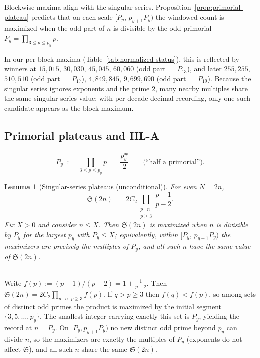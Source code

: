 \documentclass[11pt]{article}
\makeatletter
\theoremstyle{inline}
\theoremstyle{break}
\newtheorem{lemma}{Lemma}
\renewenvironment{proof}[1][\proofname]{%
  \par\pushQED{\qed}%
  \normalfont \topsep6\p@\@plus6\p@\relax
  \trivlist
  \item[\hskip\labelsep
        \itshape
    #1\@addpunct{.}]\mbox{}\\  %
}{%
  \popQED\endtrivlist\@endpefalse
}
\theoremstyle{break}
\theoremstyle{break}
\theoremstyle{break}
\theoremstyle{break}
\theoremstyle{break}
\theoremstyle{break}
\theoremstyle{inline}
\makeatother
\begin{document}
Blockwise maxima align with the singular series.  Proposition~\ref{prop:primorial-plateau} predicts that on each scale \([P_y,\,p_{y+1}P_y)\) the windowed count is maximized when the odd part of \(n\) is divisible by the odd primorial \(P_y=\prod_{3\le p\le p_y}p\).

In our per-block maxima (Table~\ref{tab:normalized-status}), this is reflected by winners at 
\(15{,}015\), \(30{,}030\), \(45{,}045\), \(60{,}060\) (odd part \(=P_{13}\)), 
and later \(255{,}255\), \(510{,}510\) (odd part \(=P_{17}\)), 
\(4{,}849{,}845\), \(9{,}699{,}690\) (odd part \(=P_{19}\)).
Because the singular series ignores exponents and the prime \(2\), many nearby multiples share the same singular-series value; with per-decade decimal recording, only one such candidate appears as the block maximum.


\subsection{Primorial plateaus and HL-A}\label{sec:primorial-prop}

\begin{equation}\label{eq:half-primorial}
P_y \;:=\; \prod_{3\le p\le p_y} p \;=\; \frac{p_y^\#}{2}\qquad\text{(``half a primorial'')}.
\end{equation}

\begin{lemma}[Singular-series plateaus (unconditional)]\label{lem:SS-plateau}
For even $N=2n$,
\begin{equation}\label{eq:sing-series-2n}
\mathfrak S(2n)\;=\;2C_2 \prod_{\substack{p\mid n\\ p\ge 3}}\frac{p-1}{p-2}.
\end{equation}
Fix $X>0$ and consider $n\le X$. Then $\mathfrak S(2n)$ is maximized when $n$ is divisible by $P_y$ for the largest $p_y$ with $P_y\le X$; equivalently, within $[P_y,\,p_{y+1}P_y)$ the maximizers are precisely the multiples of $P_y$, and all such $n$ have the same value of $\mathfrak S(2n)$.
\end{lemma}

\begin{proof}
Write $f(p):=(p-1)/(p-2)=1+\frac{1}{p-2}$. Then
\(\mathfrak S(2n)=2C_2\prod_{p\mid n,\,p\ge 3} f(p)\).
If $q>p\ge 3$ then $f(q)<f(p)$, so among sets of distinct odd primes the product is maximized by the initial segment $\{3,5,\dots,p_y\}$. The smallest integer carrying exactly this set is $P_y$, yielding the record at $n=P_y$. On $[P_y,p_{y+1}P_y)$ no new distinct odd prime beyond $p_y$ can divide $n$, so the maximizers are exactly the multiples of $P_y$ (exponents do not affect $\mathfrak S$), and all such $n$ share the same $\mathfrak S(2n)$. 
\end{proof}
\end{document}
